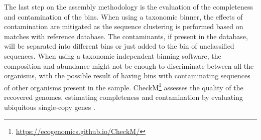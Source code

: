 The last step on the assembly methodology is the evaluation of the completeness and contamination of the bins. When using a taxonomic binner, the effects of contamination are mitigated as the sequence clustering is performed based on matches with reference database. The contaminants, if present in the database, will be separated into different bins or just added to the bin of unclassified sequences. When using a taxonomic independent binning software, the composition and abundance might not be enough to discriminate between all the organisms, with the possible result of having bins with contaminating sequences of other organisms present in the sample. CheckM\footnote{\url{https://ecogenomics.github.io/CheckM/}} assesses the quality of the recovered genomes, estimating completeness and contamination by evaluating ubiquitous single-copy genes \citep{parks_checkm_2015}.
 
